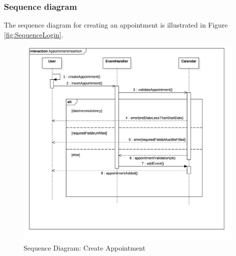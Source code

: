 \subsubsection{Sequence diagram}
The sequence diagram for creating an appointment is illustrated in Figure \ref{fig:SequenceLogin}.
\begin{figure}
	\centering
	\includegraphics[width=6in]{./diagrams/AppointmentInsertion.png}
	\caption{Sequence Diagram: Create Appointment}
	\label{fig:SequenceAddApp}
\end{figure}

